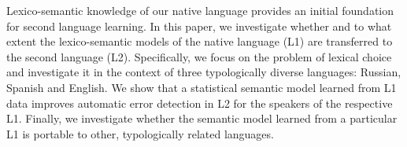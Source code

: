 Lexico-semantic knowledge of our native language provides an initial foundation for second language learning. In this paper, we investigate whether and to what extent the lexico-semantic models of the native  language (L1) are transferred to the second language (L2). Specifically, we focus on the problem of lexical choice and investigate it in the context of three typologically diverse languages: Russian, Spanish and English. We show that a statistical semantic model learned from L1 data improves automatic error detection in L2 for the speakers of the respective L1. Finally, we investigate whether the semantic model learned from a particular L1 is portable to other, typologically related languages.
